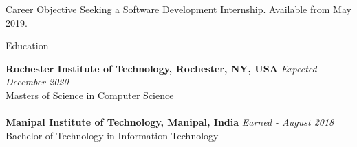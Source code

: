 \documentclass{resume} %
\begin{document}
\begin{rSection}{Career Objective}
 Seeking a Software Development Internship. Available from May 2019.
\end{rSection}

\begin{rSection}{Education}

{\bf Rochester Institute of Technology, Rochester, NY, USA} \hfill {\em Expected - December 2020} 
\\ Masters of Science in Computer Science
\\
\\{\bf Manipal Institute of Technology, Manipal, India             } \hfill {\em Earned - August 2018} 
\\ Bachelor of Technology in Information Technology
\end{rSection}
\end{document}
